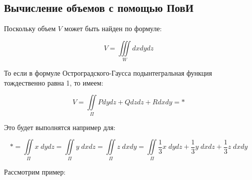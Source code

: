 \documentclass[../../main.tex]{subfiles}
\begin{document}
	
	
	\subsection{Вычисление объемов с помощью ПовИ}
	Поскольку объем $V$ может быть найден по формуле:
	
	\[ V = \iiint \limits_W dx dy dz \]
	
	То если в формуле Остроградского-Гаусса подынтегральная функция тождественно равна 1, то имеем:
	
	\[ V = \iint \limits_{\Pi} Pdydz+Qdzdz+Rdxdy = * \]
	
	Это будет выполнятся например для:
	
	\[ *=  \iint \limits_{\Pi} x \; dydz = \iint \limits_{\Pi} y \; dxdz = \iint \limits_{\Pi} z \; dxdy = \iint \limits_{\Pi}  \frac{1}{3} x \; dydz + \frac{1}{3} y \; dxdz + \frac{1}{3} z \; dxdy \]
	
	Рассмотрим пример:
	
\end{document}
